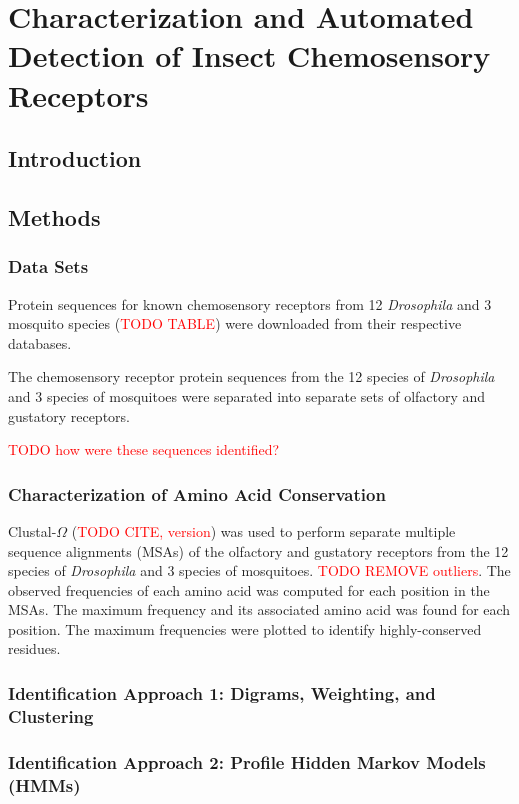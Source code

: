 \chapter{Characterization and Automated Detection of Insect Chemosensory Receptors}

\section{Introduction}

\section{Methods}

\subsection{Data Sets}

Protein sequences for known chemosensory receptors from 12 \emph{Drosophila} and 3 mosquito species (\textcolor{red}{TODO TABLE}) were downloaded from their respective databases.

The chemosensory receptor protein sequences from the 12 species of \emph{Drosophila} and 3 species of mosquitoes were separated into separate sets of olfactory and gustatory receptors.

\textcolor{red}{TODO how were these sequences identified?}

\subsection{Characterization of Amino Acid Conservation}
Clustal-$\Omega$ (\textcolor{red}{TODO CITE, version}) was used to perform separate multiple sequence alignments (MSAs) of the olfactory and gustatory receptors from the 12 species of \emph{Drosophila} and 3 species of mosquitoes.  \textcolor{red}{TODO REMOVE outliers}.  The observed frequencies of each amino acid was computed for each position in the MSAs.  The maximum frequency and its associated amino acid was found for each position.  The maximum frequencies were plotted to identify highly-conserved residues.

\subsection{Identification Approach 1: Digrams, Weighting, and Clustering}

\subsection{Identification Approach 2: Profile Hidden Markov Models (HMMs)}

